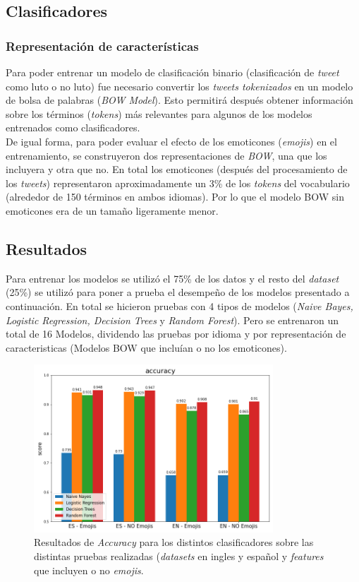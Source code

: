 \subsection{Clasificadores}

\subsubsection{Representación de características}

Para poder entrenar un modelo de clasificación binario (clasificación de \textit{tweet} como luto o no luto) fue necesario convertir los \textit{tweets tokenizados} en un modelo de bolsa de palabras (\textit{BOW Model}). Esto permitirá después obtener información sobre los términos (\textit{tokens}) más relevantes para algunos de los modelos entrenados como clasificadores. \\

De igual forma, para poder evaluar el efecto de los emoticones (\textit{emojis}) en el entrenamiento, se construyeron dos representaciones de \textit{BOW}, una que los incluyera y otra que no. En total los emoticones (después del procesamiento de los \textit{tweets}) representaron aproximadamente un 3\% de los \textit{tokens} del vocabulario (alrededor de 150 términos en ambos idiomas). Por lo que el modelo BOW sin emoticones era de un tamaño ligeramente menor.

\subsection{Resultados}

Para entrenar los modelos se utilizó el 75\% de los datos y el resto del \textit{dataset} (25\%) se utilizó para poner a prueba el desempeño de los modelos presentado a continuación. En total se hicieron pruebas con 4 tipos de modelos (\textit{Naive Bayes, Logistic Regression, Decision Trees} y \textit{Random Forest}). Pero se entrenaron un total de 16 Modelos, dividendo las pruebas por idioma y por representación de caracteristicas (Modelos BOW que incluían o no los emoticones).

\begin{figure}[H]
    \centering
    \includegraphics[width=0.8\textwidth]{results/mourning_tweets_accuracy.png}
    \caption{Resultados de \textit{Accuracy} para los distintos clasificadores sobre las distintas pruebas realizadas (\textit{datasets} en ingles y español y \textit{features} que incluyen o no \textit{emojis}.}
    \label{fig:mt_acc}
\end{figure}


